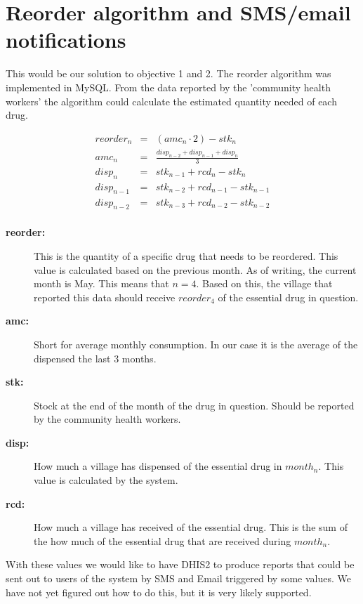 \documentclass[a4paper]{report}
\begin{document}
\section{Reorder algorithm and SMS/email notifications}
This would be our solution to objective 1 and 2. The reorder algorithm was implemented in MySQL.
From the data reported by the 'community health workers' the algorithm could calculate the estimated quantity needed of each drug.

\begin{eqnarray}
reorder_{n} & = & (amc_{n} \cdot 2) - stk_{n} \\
amc_{n} & = & \frac{disp_{n-2} + disp_{n-1} + disp_{n}}{3} \\
disp_{n} & = & stk_{n-1} + rcd_{n} - stk_{n} \\
disp_{n-1} & = & stk_{n-2} + rcd_{n-1} - stk_{n-1} \\
disp_{n-2} & = & stk_{n-3} + rcd_{n-2} - stk_{n-2} \\
\end{eqnarray}

\begin{description}
\item[\textbf{reorder:}]
	This is the quantity of a specific drug that needs to be reordered. This value is calculated based on the previous month. As of writing, the current month is May. This means that \(n=4\). Based on this, the village that reported this data should receive \(reorder_{4}\) of the essential drug in question.
\item[\textbf{amc:}]
	Short for average monthly consumption. In our case it is the average of the dispensed the last 3 months.
\item[\textbf{stk:}]
	Stock at the end of the month of the drug in question. Should be reported by the community health workers.
\item[\textbf{disp:}]
	How much a village has dispensed of the essential drug in \(month_{n}\). This value is calculated by the system. 
\item[\textbf{rcd:}]
	How much a village has received of the essential drug. This is the sum of the how much of the essential drug that are received during \(month_{n}\). 
\end{description}

With these values we would like to have DHIS2 to produce reports that could be sent out to users of the system by SMS and Email triggered by some values. We have not yet figured out how to do this, but it is very likely supported. 
\end{document}
